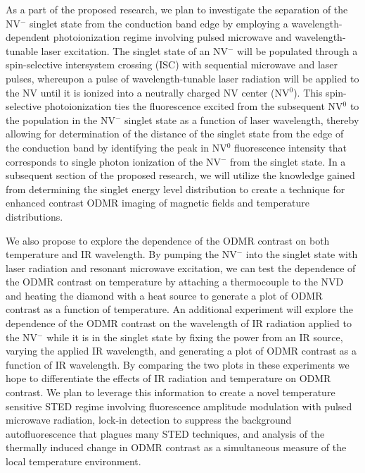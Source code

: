 \documentclass[11pt]{article}
\begin{document}
As a part of the proposed research, we plan to investigate the separation of the NV$^-$ singlet state from the 
conduction band edge by employing a wavelength-dependent photoionization regime involving pulsed microwave and 
wavelength-tunable laser excitation.  The singlet state of an NV$^-$ will be populated through a spin-selective 
intersystem crossing (ISC) with sequential microwave and laser pulses, whereupon a pulse of wavelength-tunable laser 
radiation will be applied to the NV  until it is ionized into a neutrally charged NV center (NV$^0$).  This 
spin-selective photoionization ties the fluorescence excited from the subsequent NV$^0$ to the population in the 
NV$^-$ singlet state as a function of laser wavelength, thereby allowing for determination of the distance of 
the singlet state from the edge of the conduction band by identifying the peak in NV$^0$ fluorescence intensity 
that corresponds to single photon ionization of the NV$^-$ from the singlet state.  In a subsequent section of 
the proposed research, we will utilize the knowledge gained from determining the singlet energy level 
distribution to create a technique for enhanced contrast ODMR imaging of magnetic fields and temperature 
distributions.

We also propose to explore the dependence of the ODMR contrast on both temperature and IR wavelength.  By pumping 
the NV$^-$ into the singlet state with laser radiation and resonant microwave excitation, we can test the dependence of 
the ODMR contrast on temperature by attaching a thermocouple to the NVD and heating the diamond with a heat source 
to generate a plot of ODMR contrast as a function of temperature.  An additional experiment will 
explore the dependence of the ODMR contrast on the wavelength of IR radiation applied to the NV$^-$ while it is in the 
singlet state by fixing the power from an IR source, varying the applied IR wavelength, and generating a plot of 
ODMR contrast as a function of IR wavelength.  By comparing the two plots in these experiments we hope to 
differentiate the effects of IR radiation and temperature on ODMR contrast.  We plan to leverage this information to 
create a novel temperature sensitive STED regime involving fluorescence amplitude modulation with pulsed microwave 
radiation, lock-in detection to suppress the background autofluorescence that plagues many STED techniques, and 
analysis of the thermally induced change in ODMR contrast as a simultaneous measure of the local temperature 
environment.
\end{document}
